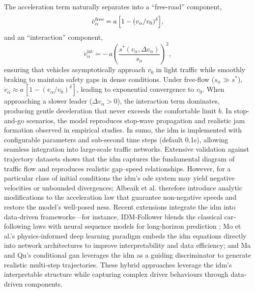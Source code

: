 
The acceleration term naturally separates into a “free-road” component,
\[
\dot{v}^\mathrm{free}_\alpha = a\,\Bigl[1 - (v_\alpha / v_0)^\delta\Bigr],
\]
and an “interaction” component,
\[
\dot{v}^\mathrm{int}_\alpha = -\,a\left(\frac{s^*(v_\alpha,\Delta v_\alpha)}{s_\alpha}\right)^2,
\]
ensuring that vehicles asymptotically approach $v_0$ in light traffic while smoothly braking to maintain safety gaps in dense conditions.
\mynewline
Under free-flow ($s_\alpha\gg s^*$), $\dot{v}_\alpha\approx a\,[1-(v_\alpha/v_0)^\delta]$, leading to exponential convergence to $v_0$. When approaching a slower leader ($\Delta v_\alpha>0$), the interaction term dominates, producing gentle deceleration that never exceeds the comfortable limit $b$. In stop-and-go scenarios, the model reproduces stop-wave propagation and realistic jam formation observed in empirical studies. \cite{Treiber_2000}
\mynewline
In \ac{sumo}, the \ac{idm} is implemented with configurable parameters and sub-second time steps (default 0.1s), allowing seamless integration into large-scale traffic networks. \cite{Krajzewicz2002}
\mynewline
Extensive validation against trajectory datasets shows that the \ac{idm} captures the fundamental diagram of traffic flow and reproduces realistic gap–speed relationships. \cite{Treiber_2000, Kesting_2008, TREIBER2013922} However, for a particular class of initial conditions the \ac{idm}’s \ac{ode} system may yield negative velocities or unbounded divergences; Albeaik et al. \cite{Albeaik2022} therefore introduce analytic modifications to the acceleration law that guarantee non-negative speeds and restore the model’s well-posed ness.
Recent extensions integrate the \ac{idm} into data‐driven frameworks—for instance, IDM‐Follower blends the classical car‐following laws with neural sequence models for long‐horizon prediction \cite{IDM_Wang2022}; Mo et al.’s \cite{Mo2020PIDL} physics‐informed deep learning paradigm embeds the \ac{idm} equations directly into network architectures to improve interpretability and data efficiency; and Ma and Qu’s \cite{MaQu2023} conditional \ac{gan} leverages the \ac{idm} as a guiding discriminator to generate realistic multi‐step trajectories. These hybrid approaches leverage the \ac{idm}’s interpretable structure while capturing complex driver behaviours through data-driven components.

